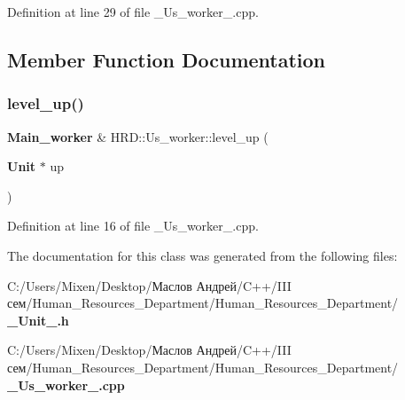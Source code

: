 Definition at line 29 of file \+\_\+\+Us\+\_\+worker\+\_\+.\+cpp.



\subsection{Member Function Documentation}
\mbox{\label{class_h_r_d_1_1_us__worker_ab5059f9f2a77131ca271081d36e77080}} 
\subsubsection{level\+\_\+up()}
{\footnotesize\ttfamily \textbf{ Main\+\_\+worker} \& H\+R\+D\+::\+Us\+\_\+worker\+::level\+\_\+up (\begin{DoxyParamCaption}\item[{\textbf{ Unit} $\ast$}]{up }\end{DoxyParamCaption})}



Definition at line 16 of file \+\_\+\+Us\+\_\+worker\+\_\+.\+cpp.



The documentation for this class was generated from the following files\+:\begin{DoxyCompactItemize}
\item 
C\+:/\+Users/\+Mixen/\+Desktop/Маслов Андрей/\+C++/\+I\+I\+I сем/\+Human\+\_\+\+Resources\+\_\+\+Department/\+Human\+\_\+\+Resources\+\_\+\+Department/\textbf{ \+\_\+\+Unit\+\_\+.\+h}\item 
C\+:/\+Users/\+Mixen/\+Desktop/Маслов Андрей/\+C++/\+I\+I\+I сем/\+Human\+\_\+\+Resources\+\_\+\+Department/\+Human\+\_\+\+Resources\+\_\+\+Department/\textbf{ \+\_\+\+Us\+\_\+worker\+\_\+.\+cpp}\end{DoxyCompactItemize}
